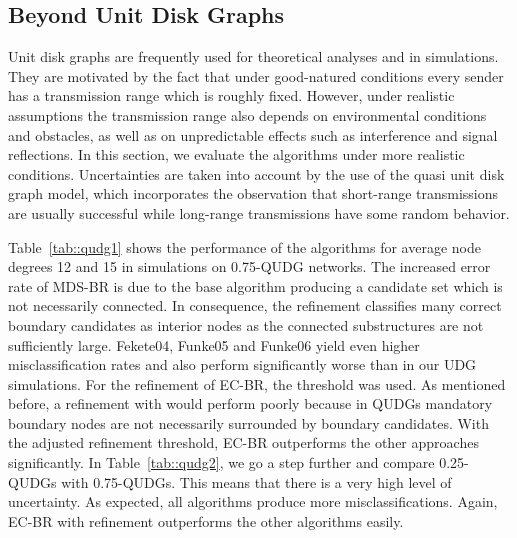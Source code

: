 \documentclass{llncs}
\begin{document}
\subsection{Beyond Unit Disk Graphs}
Unit disk graphs are frequently used for theoretical analyses and in simulations.
They are motivated by the fact that under good-natured conditions every sender has a transmission range which is roughly fixed.
However, under realistic assumptions the transmission range also depends on environmental conditions and obstacles, as well as on unpredictable effects such as interference and signal reflections.
In this section, we evaluate the algorithms under more realistic conditions.
Uncertainties are taken into account by the use of the quasi unit disk graph model, which incorporates the observation that short-range transmissions are usually successful while long-range transmissions have some random behavior.

Table~\ref{tab::qudg1} shows the performance of the algorithms for average node degrees 12 and 15 in simulations on 0.75-QUDG networks.
The increased error rate of MDS-BR is due to the base algorithm producing a candidate set which is not necessarily connected.
In consequence, the refinement classifies many correct boundary candidates as interior nodes as the connected substructures are not sufficiently large.
Fekete04, Funke05 and Funke06 yield even higher misclassification rates and also perform significantly worse than in our UDG simulations.
For the refinement of EC-BR, the threshold  was used.
As mentioned before, a refinement with  would perform poorly because in QUDGs mandatory boundary nodes are not necessarily surrounded by boundary candidates.
With the adjusted refinement threshold, EC-BR  outperforms the other approaches significantly.
In Table~\ref{tab::qudg2}, we go a step further and compare 0.25-QUDGs with 0.75-QUDGs.
This means that there is a very high level of uncertainty.
As expected, all algorithms produce more misclassifications.
Again, EC-BR with refinement outperforms the other algorithms easily.
\end{document}
